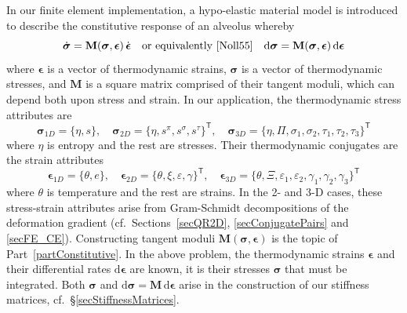 In our finite element implementation, a hypo-elastic material model \cite{Truesdell55} is introduced to describe the constitutive response of an alveolus whereby
\begin{displaymath}
    \dot{\boldsymbol{\sigma}} = \mathbf{M} ( \boldsymbol{\sigma} , \boldsymbol{\epsilon} ) \, \dot{\boldsymbol{\epsilon}} 
    \quad \text{or equivalently \cite{Noll55}} \quad
    \mathrm{d} \boldsymbol{\sigma} = \mathbf{M} ( \boldsymbol{\sigma} , \boldsymbol{\epsilon} ) \, \mathrm{d} \boldsymbol{\epsilon}
\end{displaymath} 
where $\boldsymbol{\epsilon}$ is a vector of thermo\-dynamic strains, $\boldsymbol{\sigma}$ is a vector of thermo\-dynamic stresses, and $\mathbf{M}$ is a square matrix comprised of their tangent moduli, which can depend both upon stress and strain.  In our application, the thermo\-dynamic stress attributes are 
\begin{displaymath}
   \boldsymbol{\sigma}_{1D} = \{ \eta , s \} , \quad
   \boldsymbol{\sigma}_{2D} = \{ \eta , s^{\pi} , s^{\sigma} , s^{\tau} \}^{\mathsf{T}} , \quad
   \boldsymbol{\sigma}_{3D} = \{ \eta , \Pi , \sigma_1 , \sigma_2 , \tau_1 , \tau_2 , \tau_3 \}^{\mathsf{T}}
\end{displaymath}
where $\eta$ is entropy and the rest are stresses.  Their thermo\-dynamic conjugates are the strain attributes
\begin{displaymath}
\boldsymbol{\epsilon}_{1D} = \{ \theta , e \} , \quad
\boldsymbol{\epsilon}_{2D} = \{ \theta , \xi , \varepsilon , \gamma \}^{\mathsf{T}} , \quad
\boldsymbol{\epsilon}_{3D} = \{ \theta , \Xi , \varepsilon_1 , \varepsilon_2 , \gamma_1 , \gamma_2 , \gamma_3 \}^{\mathsf{T}}
\end{displaymath}
where $\theta$ is temperature and the rest are strains.  In the 2- and 3-D cases, these stress-strain attributes arise from Gram-Schmidt decompositions of the deformation gradient (cf.\ Sections~\ref{secQR2D}, \ref{secConjugatePairs} and \ref{secFE_CE}).  Constructing tangent moduli $\mathbf{M} ( \boldsymbol{\sigma} , \boldsymbol{\epsilon} )$ is the topic of Part~\ref{partConstitutive}.  In the above problem, the thermo\-dynamic strains $\boldsymbol{\epsilon}$ and their differential rates $\mathrm{d} \boldsymbol{\epsilon}$ are known, it is their stresses $\boldsymbol{\sigma}$ that must be integrated.  Both $\boldsymbol{\sigma}$ and $\mathrm{d} \boldsymbol{\sigma} = \mathbf{M} \, \mathrm{d} \boldsymbol{\epsilon}$ arise in the construction of our stiffness matrices, cf.\ \S\ref{secStiffnessMatrices}.

